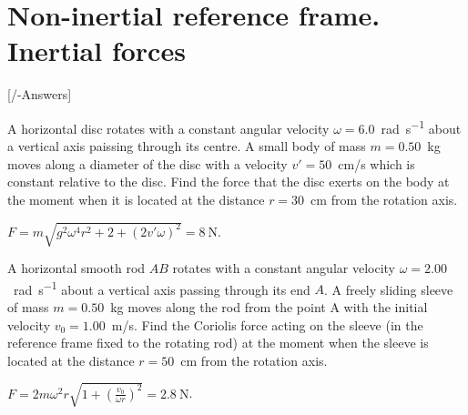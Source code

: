 
\chapter{Non-inertial reference frame. Inertial forces}\label{\currfilebase}
[\currfilebase/\currfilebase-Answers]
%


\begin{problem}
	A horizontal disc rotates with a constant angular velocity $\omega = 6.0$~\si{\radian\per\second} about a vertical axis paissing through its centre. A small body of mass $m = 0.50$~kg moves along a diameter of the disc with a velocity $v' = 50$~cm/s which is constant relative to the disc. Find the force that the disc exerts on the body at the moment when it is located at the distance $r = 30$~cm from the rotation axis. 	
	\begin{solution}
		$F = m\sqrt{g^2  \omega^4 r^2 + 2 + (2v'\omega)^2} = 8~\si{\newton}$.
	\end{solution}
\end{problem}


\begin{problem}
	A horizontal smooth rod $AB$ rotates with a constant angular velocity $\omega = 2.00$~\si{\radian\per\second} about a vertical axis passing through its end $A$. A freely sliding sleeve of mass $m = 0.50$~kg moves along the rod from the point A with the initial velocity $v_0 = 1.00$~m/s. Find the Coriolis force acting on the sleeve (in the reference frame fixed to the rotating rod) at the moment when the sleeve is located at the distance $r = 50$~cm from the rotation axis.
	\begin{solution}
		$F = 2m\omega^2r\sqrt{1 + \left(\frac{v_0}{\omega r} \right)^2 } = 2.8~\si{\newton}$.
	\end{solution}
\end{problem}


